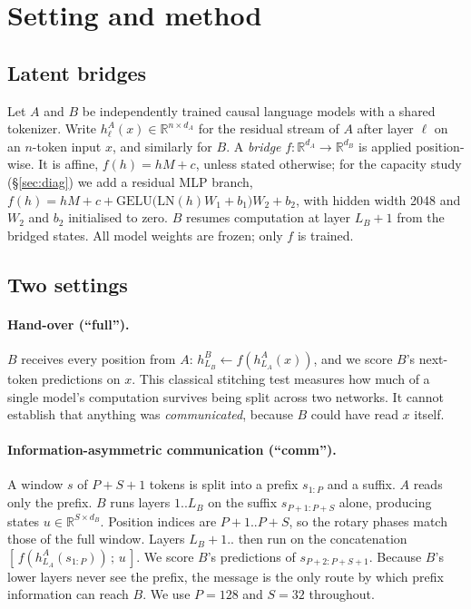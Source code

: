 \section{Setting and method}
\label{sec:method}

\subsection{Latent bridges}
Let $A$ and $B$ be independently trained causal language models with a shared tokenizer. Write $h^A_\ell(x) \in \mathbb{R}^{n\times d_A}$ for the residual stream of $A$ after layer $\ell$ on an $n$-token input $x$, and similarly for $B$. A \emph{bridge} $f:\mathbb{R}^{d_A}\to\mathbb{R}^{d_B}$ is applied position-wise. It is affine, $f(h)=hM+c$, unless stated otherwise; for the capacity study (\S\ref{sec:diag}) we add a residual MLP branch, $f(h) = hM + c + \mathrm{GELU}\big(\mathrm{LN}(h)W_1 + b_1\big)W_2 + b_2$, with hidden width 2048 and $W_2$ and $b_2$ initialised to zero. $B$ resumes computation at layer $L_B+1$ from the bridged states. All model weights are frozen; only $f$ is trained.

\subsection{Two settings}
\label{sec:protocol}

\paragraph{Hand-over (``full'').}
$B$ receives every position from $A$: $h^B_{L_B} \leftarrow f(h^A_{L_A}(x))$, and we score $B$'s next-token predictions on $x$. This classical stitching test measures how much of a single model's computation survives being split across two networks. It cannot establish that anything was \emph{communicated}, because $B$ could have read $x$ itself.

\paragraph{Information-asymmetric communication (``comm'').}
A window $s$ of $P+S+1$ tokens is split into a prefix $s_{1:P}$ and a suffix. $A$ reads only the prefix. $B$ runs layers $1..L_B$ on the suffix $s_{P+1:P+S}$ alone, producing states $u\in\mathbb{R}^{S\times d_B}$. Position indices are $P+1..P+S$, so the rotary phases match those of the full window. Layers $L_B+1..$ then run on the concatenation $[\,f(h^A_{L_A}(s_{1:P}))\,;\,u\,]$. We score $B$'s predictions of $s_{P+2:P+S+1}$. Because $B$'s lower layers never see the prefix, the message is the only route by which prefix information can reach $B$. We use $P=128$ and $S=32$ throughout.

